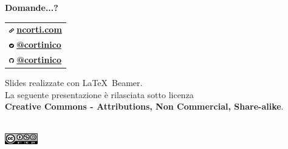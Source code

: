 \documentclass[xcolor=svgnames,11pt]{beamer}
\begin{document}
\begin{frame}{}
\begin{center}
\begin{Huge}
{\color{leorange} \textbf{Domande...?}}
\end{Huge}

\vspace{1.5cm}

\begin{center}
\begin{tabular}{>{\centering\arraybackslash}p{4cm}}
\includegraphics[height=0.2cm]{img/logo_web.pdf} \textbf{\href{https://ncorti.com}{ ncorti.com}} \\
\includegraphics[height=0.2cm]{img/logo_twitter.pdf} \textbf{\href{https://twitter.com/cortinico}{ @cortinico}} \\
\includegraphics[height=0.2cm]{img/logo_gh.pdf} \textbf{\href{https://github.com/cortinico}{ @cortinico}} \\
\end{tabular}
\end{center}

\bigskip

\begin{footnotesize}
Slides realizzate con \LaTeX\ Beamer.\\
La seguente presentazione \`e rilasciata sotto licenza\\
\textbf{Creative Commons - Attributions, Non Commercial, Share-alike}.
\end{footnotesize}
\\
\medskip
\includegraphics[height=0.5cm]{img/cc.png}

\end{center}
\end{frame}
\end{document}
